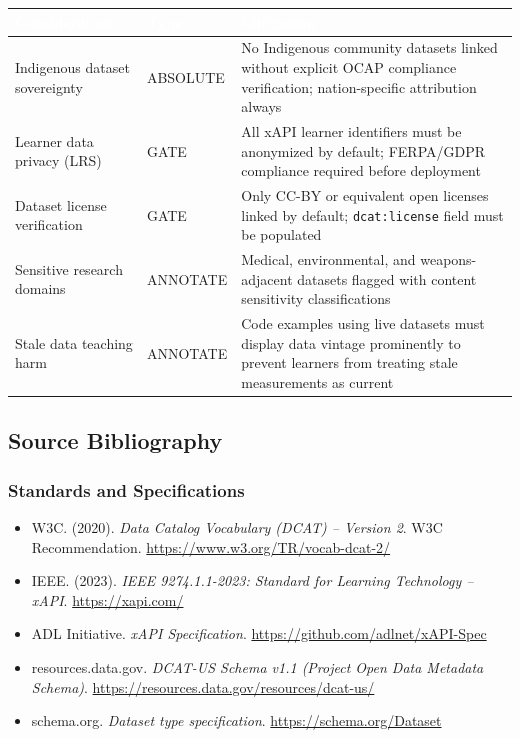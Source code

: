 \documentclass[11pt,letterpaper]{article}
\newcommand{\tableheader}[1]{\textbf{\sffamily\textcolor{white}{#1}}}
\begin{document}
\begin{center}
\begin{tabularx}{\textwidth}{L{3cm}L{2cm}X}
\toprule
{}
\tableheader{Consideration} & \tableheader{Type} & \tableheader{Mitigation} \\
\midrule
Indigenous dataset sovereignty & ABSOLUTE & No Indigenous community datasets linked without explicit OCAP\textregistered{} compliance verification; nation-specific attribution always \\
Learner data privacy (LRS) & GATE & All xAPI learner identifiers must be anonymized by default; FERPA/GDPR compliance required before deployment \\
Dataset license verification & GATE & Only CC-BY or equivalent open licenses linked by default; \texttt{dcat:license} field must be populated \\
Sensitive research domains & ANNOTATE & Medical, environmental, and weapons-adjacent datasets flagged with content sensitivity classifications \\
Stale data teaching harm & ANNOTATE & Code examples using live datasets must display data vintage prominently to prevent learners from treating stale measurements as current \\
\bottomrule
\end{tabularx}
\end{center}

\subsection{Source Bibliography}

\subsubsection{Standards and Specifications}

\begin{itemize}
  \item W3C. (2020). \textit{Data Catalog Vocabulary (DCAT) -- Version 2}. W3C Recommendation. \url{https://www.w3.org/TR/vocab-dcat-2/}
  \item IEEE. (2023). \textit{IEEE 9274.1.1-2023: Standard for Learning Technology -- xAPI}. \url{https://xapi.com/}
  \item ADL Initiative. \textit{xAPI Specification}. \url{https://github.com/adlnet/xAPI-Spec}
  \item resources.data.gov. \textit{DCAT-US Schema v1.1 (Project Open Data Metadata Schema)}. \url{https://resources.data.gov/resources/dcat-us/}
  \item schema.org. \textit{Dataset type specification}. \url{https://schema.org/Dataset}
\end{itemize}
\end{document}
